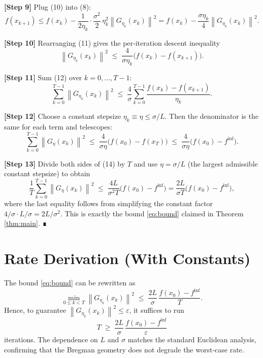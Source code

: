 \documentclass[11pt]{article}
\newcommand{\norm}[1]{\left\lVert#1\right\rVert}
\begin{document}
\noindent\textbf{[Step 9]} Plug (10) into (8):
\[
f(x_{k+1})\le f(x_{k})-\frac{1}{2\eta_{k}}\cdot\frac{\sigma^{2}}{2}\,\eta_{k}^{2}\norm{G_{\eta_{k}}(x_{k})}^{2}
=
f(x_{k})-\frac{\sigma\eta_{k}}{4}\norm{G_{\eta_{k}}(x_{k})}^{2}.
\tag{11}
\]

\noindent\textbf{[Step 10]} Rearranging (11) gives the per‑iteration descent inequality
\[
\norm{G_{\eta_{k}}(x_{k})}^{2}\;\le\;\frac{4}{\sigma\eta_{k}}\bigl(f(x_{k})-f(x_{k+1})\bigr).
\tag{12}
\]

\noindent\textbf{[Step 11]} Sum (12) over $k=0,\dots,T-1$:
\[
\sum_{k=0}^{T-1}\norm{G_{\eta_{k}}(x_{k})}^{2}
\;\le\;
\frac{4}{\sigma}\sum_{k=0}^{T-1}\frac{f(x_{k})-f(x_{k+1})}{\eta_{k}}.
\tag{13}
\]

\noindent\textbf{[Step 12]} Choose a constant stepsize $\eta_{k}\equiv\eta\le\sigma/L$. Then the denominator is the same for each term and telescopes:
\[
\sum_{k=0}^{T-1}\norm{G_{\eta}(x_{k})}^{2}
\;\le\;
\frac{4}{\sigma\eta}\bigl(f(x_{0})-f(x_{T})\bigr)
\;\le\;
\frac{4}{\sigma\eta}\bigl(f(x_{0})-f^{\inf}\bigr).
\tag{14}
\]

\noindent\textbf{[Step 13]} Divide both sides of (14) by $T$ and use $\eta=\sigma/L$ (the largest admissible constant stepsize) to obtain
\[
\frac{1}{T}\sum_{k=0}^{T-1}\norm{G_{\eta}(x_{k})}^{2}
\;\le\;
\frac{4L}{\sigma^{2}T}\bigl(f(x_{0})-f^{\inf}\bigr)
=
\frac{2L}{\sigma T}\bigl(f(x_{0})-f^{\inf}\bigr),
\]
where the last equality follows from simplifying the constant factor $4/\sigma\cdot L/\sigma = 2L/\sigma^{2}$.
This is exactly the bound \eqref{eq:bound} claimed in Theorem \ref{thm:main}. ∎

\section*{Rate Derivation (With Constants)}
The bound \eqref{eq:bound} can be rewritten as
\[
\min_{0\le k<T}\norm{G_{\eta_{k}}(x_{k})}^{2}
\;\le\;
\frac{2L}{\sigma}\,\frac{f(x_{0})-f^{\inf}}{T}.
\]
Hence, to guarantee $\norm{G_{\eta_{k}}(x_{k})}^{2}\le\varepsilon$, it suffices to run
\[
T\;\ge\;\frac{2L}{\sigma}\,\frac{f(x_{0})-f^{\inf}}{\varepsilon}
\]
iterations. The dependence on $L$ and $\sigma$ matches the standard Euclidean analysis, confirming that the Bregman geometry does not degrade the worst‑case rate.
\end{document}
